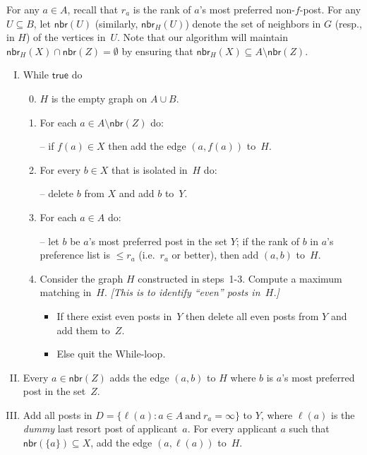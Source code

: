 \documentclass[11pt]{llncs}
\newcommand{\Nbr}{\mathsf{nbr}}
\begin{document}
For any $a \in A$, recall that $r_a$ is the rank of $a$'s most preferred non-$f$-post.
For any $U \subseteq B$, let $\Nbr(U)$ (similarly, $\Nbr_H(U)$) denote the set of neighbors in 
$G$ (resp., in $H$) of the vertices in~$U$. Note that our algorithm will maintain
$\Nbr_H(X) \cap \Nbr(Z) = \emptyset$ by ensuring that $\Nbr_H(X) \subseteq A \setminus \Nbr(Z)$. 


\begin{enumerate}[(I)]
\item While $\mathsf{true}$ do
\begin{enumerate}[1.]
\setcounter{enumii}{-1}
\item $H$ is the empty graph on $A \cup B$.
\item For each $a \in A \setminus \Nbr(Z)$ do: 

-- if $f(a) \in X$ then add the edge $(a,f(a))$ to~$H$.

\item For every $b \in X$ that is isolated in~$H$ do: 

-- delete $b$ from $X$ and add $b$ to~$Y$.

\item For each $a \in A$ do: 

-- let $b$ be $a$'s most preferred post in the set $Y$; if the rank of $b$ in $a$'s preference 
list is $\le r_a$ (i.e.\ $r_a$ or better), then add $(a,b)$ to~$H$.

\item Consider the graph $H$ constructed in steps~1-3.  Compute a maximum matching in~$H$. 
{\em [This is to identify ``even'' posts in~$H$.]}
\begin{itemize}
\item If there exist even posts in~$Y$ then delete all even posts from $Y$ and add them 
to~$Z$.
\item Else quit the While-loop.
\end{itemize}
\end{enumerate}

\smallskip

\item Every $a \in \Nbr(Z)$ adds the edge $(a,b)$ to $H$ where $b$ is $a$'s most preferred post 
in the set~$Z$. 

\smallskip

\item Add all posts in $D = \{\ell(a): a \in A\ \mathrm{and}\ r_a=\infty\}$ to $Y$, where 
$\ell(a)$ is the {\em dummy} last resort post of applicant~$a$. For every applicant $a$ such that 
$\Nbr(\{a\}) \subseteq X$, add the edge $(a,\ell(a))$ to~$H$. 
\end{enumerate}
\end{document}

